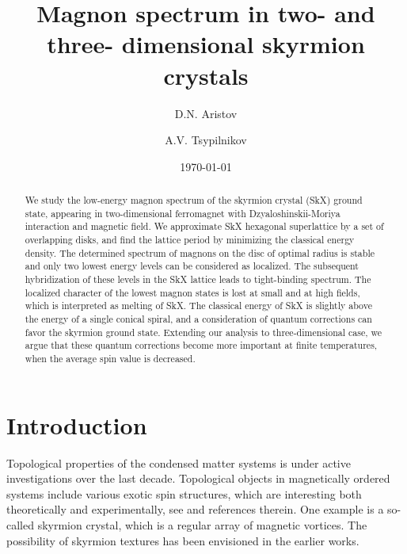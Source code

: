 \documentclass[aps,prb,twocolumn,superscriptaddress,nobalancelastpage]{revtex4-1}
\begin{document}
\title{Magnon spectrum in two- and three- dimensional skyrmion crystals}
\author{D.N. Aristov}
\author{A.V. Tsypilnikov}
\date{\today}

\begin{abstract}
We study the low-energy  magnon spectrum of the skyrmion crystal  (SkX) ground state, appearing in  
two-dimensional ferromagnet with Dzyaloshinskii-Moriya interaction and magnetic field. 
We approximate SkX hexagonal superlattice by a set of overlapping disks, and find the lattice period by minimizing the classical energy density. The determined spectrum of magnons on the disc of optimal radius is stable and only two lowest energy levels can be considered as localized. The subsequent hybridization of these levels in the SkX lattice leads to tight-binding spectrum. The localized character of the lowest magnon states is lost at small and at high fields, which is interpreted as melting of SkX. The classical energy of SkX  is slightly above the energy of a single conical spiral, and a consideration of quantum corrections can favor the skyrmion ground state. Extending our analysis to three-dimensional case, we argue that these quantum corrections become more important at finite temperatures, when the average spin value is decreased.  
\end{abstract}

\maketitle

\section*{Introduction}

Topological properties of the condensed matter systems is under active investigations over the last decade. 
Topological objects in magnetically ordered systems include 
various exotic spin structures, which are interesting both  theoretically and experimentally, see  \cite{SeidelBook2016} and references therein. One example is a so-called skyrmion crystal, which is a regular array of magnetic vortices.  The possibility of skyrmion textures  has been envisioned in the earlier works.\cite{Belavin1975, Bogdanov1994,   Ivanov1995, roslerBogdanov2006}
\end{document}
